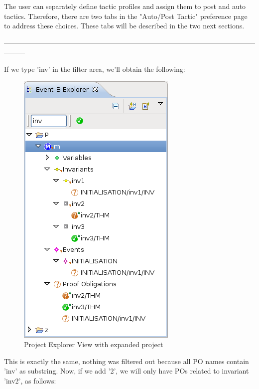 The user can separately define tactic profiles and assign them to post and auto tactics. Therefore, there are two tabs in the "Auto/Post Tactic" preference page to address these choices. These tabs will be described in the two next sections. 

---------------------------------------------------------------------------------------------------------------------

If we type 'inv' in the filter area, we'll obtain the following:

\begin{figure}[!h]
\begin{center}
	\includegraphics{img/reference/ref_01_project_explorer5.png}
	\caption{Project Explorer View with expanded project}
	\label{fig_ref_01_project_explorer5}
\end{center}
\end{figure}

This is exactly the same, nothing was filtered out because all PO names contain 'inv' as substring. Now, if we add '2', we will only have POs related to invariant 'inv2', as follows: 


